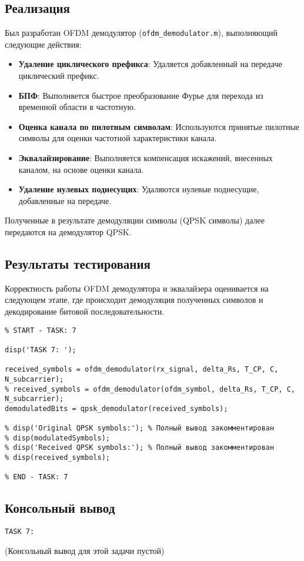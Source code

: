 \subsection{Реализация}
Был разработан OFDM демодулятор (\texttt{ofdm\_demodulator.m}), выполняющий следующие действия:
\begin{itemize}
    \item \textbf{Удаление циклического префикса}: Удаляется добавленный на передаче циклический префикс.
    \item \textbf{БПФ}: Выполняется быстрое преобразование Фурье для перехода из временной области в частотную.
    \item \textbf{Оценка канала по пилотным символам}: Используются принятые пилотные символы для оценки частотной характеристики канала.
    \item \textbf{Эквалайзирование}: Выполняется компенсация искажений, внесенных каналом, на основе оценки канала.
    \item \textbf{Удаление нулевых поднесущих}: Удаляются нулевые поднесущие, добавленные на передаче.
\end{itemize}
Полученные в результате демодуляции символы (QPSK символы) далее передаются на демодулятор QPSK.

\subsection{Результаты тестирования}
Корректность работы OFDM демодулятора и эквалайзера оценивается на следующем этапе, где происходит демодуляция полученных символов и декодирование битовой последовательности.

\begin{verbatim}
% START - TASK: 7

disp('TASK 7: ');

received_symbols = ofdm_demodulator(rx_signal, delta_Rs, T_CP, C, N_subcarrier);
% received_symbols = ofdm_demodulator(ofdm_symbol, delta_Rs, T_CP, C, N_subcarrier);
demodulatedBits = qpsk_demodulator(received_symbols);

% disp('Original QPSK symbols:'); % Полный вывод закомментирован
% disp(modulatedSymbols);
% disp('Received QPSK symbols:'); % Полный вывод закомментирован
% disp(received_symbols);

% END - TASK: 7
\end{verbatim}

\subsection{Консольный вывод}
\begin{verbatim}
TASK 7:
\end{verbatim}
(Консольный вывод для этой задачи пустой)

